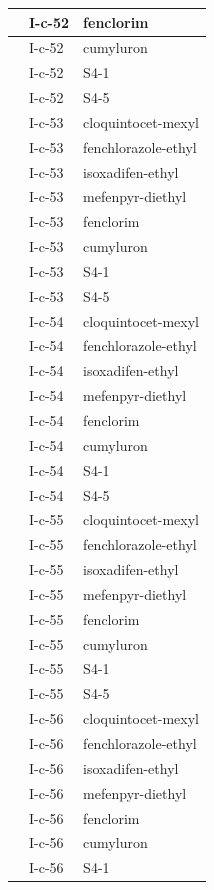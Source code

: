\documentclass[11pt,a4paper]{article}
\begin{document}
\begin{table}[h]
\begin{tabular}{|l|l|l|}
 & I-c-52 & fenclorim \\ \hline
 & I-c-52 & cumyluron \\ \hline
 & I-c-52 & S4-1 \\ \hline
 & I-c-52 & S4-5 \\ \hline
 & I-c-53 & cloquintocet-mexyl \\ \hline
 & I-c-53 & fenchlorazole-ethyl \\ \hline
 & I-c-53 & isoxadifen-ethyl \\ \hline
 & I-c-53 & mefenpyr-diethyl \\ \hline
 & I-c-53 & fenclorim \\ \hline
 & I-c-53 & cumyluron \\ \hline
 & I-c-53 & S4-1 \\ \hline
 & I-c-53 & S4-5 \\ \hline
 & I-c-54 & cloquintocet-mexyl \\ \hline
 & I-c-54 & fenchlorazole-ethyl \\ \hline
 & I-c-54 & isoxadifen-ethyl \\ \hline
 & I-c-54 & mefenpyr-diethyl \\ \hline
 & I-c-54 & fenclorim \\ \hline
 & I-c-54 & cumyluron \\ \hline
 & I-c-54 & S4-1 \\ \hline
 & I-c-54 & S4-5 \\ \hline
 & I-c-55 & cloquintocet-mexyl \\ \hline
 & I-c-55 & fenchlorazole-ethyl \\ \hline
 & I-c-55 & isoxadifen-ethyl \\ \hline
 & I-c-55 & mefenpyr-diethyl \\ \hline
 & I-c-55 & fenclorim \\ \hline
 & I-c-55 & cumyluron \\ \hline
 & I-c-55 & S4-1 \\ \hline
 & I-c-55 & S4-5 \\ \hline
 & I-c-56 & cloquintocet-mexyl \\ \hline
 & I-c-56 & fenchlorazole-ethyl \\ \hline
 & I-c-56 & isoxadifen-ethyl \\ \hline
 & I-c-56 & mefenpyr-diethyl \\ \hline
 & I-c-56 & fenclorim \\ \hline
 & I-c-56 & cumyluron \\ \hline
 & I-c-56 & S4-1 \\ \hline

\end{tabular}
\end{table}
\end{document}
